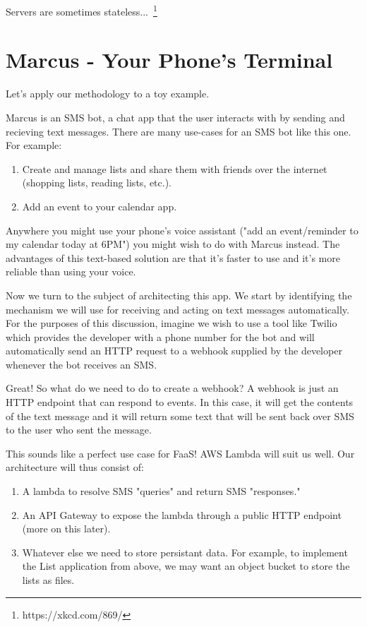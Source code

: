 \documentclass{article}
\begin{document}
Servers are sometimes stateless...~\footnote{https://xkcd.com/869/}

\section{Marcus - Your Phone's Terminal}

Let's apply our methodology to a toy example.

Marcus is an SMS bot, a chat app that the user interacts with by sending and recieving text messages.
There are many use-cases for an SMS bot like this one.
For example:

\begin{enumerate}
  \item Create and manage lists and share them with friends over the internet (shopping lists, reading lists, etc.).
  \item Add an event to your calendar app.
\end{enumerate}

Anywhere you might use your phone's voice assistant ("add an event/reminder to my calendar today at 6PM") you might wish to do with Marcus instead.
The advantages of this text-based solution are that it's faster to use and it's more reliable than using your voice.

Now we turn to the subject of architecting this app.
We start by identifying the mechanism we will use for receiving and acting on text messages automatically.
For the purposes of this discussion, imagine we wish to use a tool like Twilio which provides the developer with a phone number for the bot and will automatically send an HTTP request to a webhook supplied by the developer whenever the bot receives an SMS.

Great!
So what do we need to do to create a webhook?
A webhook is just an HTTP endpoint that can respond to events.
In this case, it will get the contents of the text message and it will return some text that will be sent back over SMS to the user who sent the message.

This sounds like a perfect use case for FaaS!
AWS Lambda will suit us well.
Our architecture will thus consist of:

\begin{enumerate}
  \item A lambda to resolve SMS "queries" and return SMS "responses."
  \item An API Gateway to expose the lambda through a public HTTP endpoint (more on this later).
  \item Whatever else we need to store persistant data. For example, to implement the List application from above, we may want an object bucket to store the lists as files.
\end{enumerate}
\end{document}
